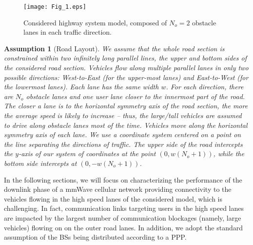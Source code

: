 \documentclass[10pt,journal,a4paper]{IEEEtran}
\newtheorem{assumption}{Assumption}[section]
\begin{document}
\begin{figure}[t]
\vspace{-3mm}
\centering
\texttt{[image: Fig\_1.eps]}
\caption{Considered highway system model, composed of $N_o = 2$ obstacle lanes in each traffic direction.}\label{fig.SM}
\vspace{-4mm}
\end{figure}

\begin{assumption}[Road Layout]\label{ass.roadL}
We assume that the whole road section is constrained within two infinitely long parallel lines, the \emph{upper} and \emph{bottom sides} of the considered road section. Vehicles flow along multiple parallel lanes in only two possible directions: West-to-East (for the upper-most lanes) and East-to-West (for the lowermost lanes). Each lane has the same width $w$. For each direction, there are $N_o$ obstacle lanes and one user lane closer to the innermost part of the road. The closer a lane is to the horizontal symmetry axis of the road section, the more the average speed is likely to increase -- thus, the large/tall vehicles are assumed to drive along obstacle lanes most of the time. Vehicles move along the horizontal symmetry axis of each lane. We use a coordinate system centered on a point on the line separating the directions of traffic. The upper side of the road intercepts the $y$-axis of our system of coordinates at the point $(0, w(N_o + 1))$, while the bottom side intercepts at $(0, -w(N_o + 1))$. 
\end{assumption}

In the following sections, we will focus on characterizing the performance of the downlink phase of a mmWave cellular network providing connectivity to the vehicles flowing in the high speed lanes of the considered model, which is challenging. In fact, communication links targeting users in the high speed lanes are impacted by the largest number of communication blockages (namely, large vehicles) flowing on on the outer road lanes. In addition, we adopt the standard assumption of the BSs being distributed according to a PPP.
\end{document}
